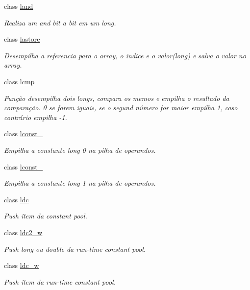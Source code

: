 \begin{DoxyCompactItemize}
class \hyperlink{class_instruction_impl_1_1land}{land}
\begin{DoxyCompactList}\small\item\em Realiza um and bit a bit em um long. \end{DoxyCompactList}\item 
class \hyperlink{class_instruction_impl_1_1lastore}{lastore}
\begin{DoxyCompactList}\small\item\em Desempilha a referencia para o array, o indice e o valor(long) e salva o valor no array. \end{DoxyCompactList}\item 
class \hyperlink{class_instruction_impl_1_1lcmp}{lcmp}
\begin{DoxyCompactList}\small\item\em Função desempilha dois longs, compara os memos e empilha o resultado da comparação. 0 se forem iguais, se o segund número for maior empilha 1, caso contrário empilha -\/1. \end{DoxyCompactList}\item 
class \hyperlink{class_instruction_impl_1_1lconst__0}{lconst\+\_}
\begin{DoxyCompactList}\small\item\em Empilha a constante long 0 na pilha de operandos. \end{DoxyCompactList}\item 
class \hyperlink{class_instruction_impl_1_1lconst__1}{lconst\+\_}
\begin{DoxyCompactList}\small\item\em Empilha a constante long 1 na pilha de operandos. \end{DoxyCompactList}\item 
class \hyperlink{class_instruction_impl_1_1ldc}{ldc}
\begin{DoxyCompactList}\small\item\em Push item da constant pool. \end{DoxyCompactList}\item 
class \hyperlink{class_instruction_impl_1_1ldc2__w}{ldc2\+\_\+w}
\begin{DoxyCompactList}\small\item\em Push long ou double da run-\/time constant pool. \end{DoxyCompactList}\item 
class \hyperlink{class_instruction_impl_1_1ldc__w}{ldc\+\_\+w}
\begin{DoxyCompactList}\small\item\em Push item da run-\/time constant pool. \end{DoxyCompactList}\item 

\end{DoxyCompactItemize}
